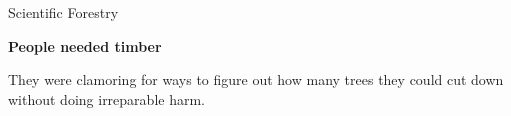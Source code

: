 \documentclass[presentation]{subfiles}
\begin{document}
\begin{frame}[t]{Scientific Forestry}

\textbf{People needed timber}

They were clamoring for ways to figure out how many trees they could cut down without doing irreparable harm.

\begin{columns}
\begin{column}{0.66\textwidth}


\end{column}
\end{columns}
\end{frame}
\end{document}
